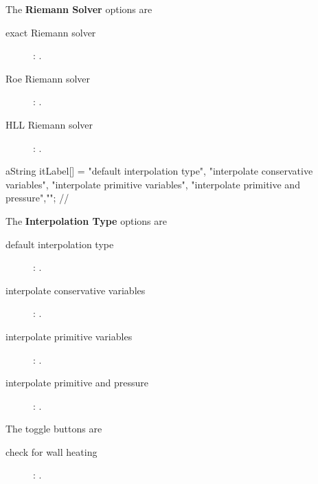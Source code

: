 \documentclass{article}
\begin{document}
\noindent The {\bf Riemann Solver} options are
\begin{description}
  \item[\qquad exact Riemann solver] : .
  \item[\qquad Roe Riemann solver] : .
  \item[\qquad HLL Riemann solver] : .
\end{description}


  aString itLabel[] = {"default interpolation type",
                       "interpolate conservative variables",
                       "interpolate primitive variables",
                       "interpolate primitive and pressure",""}; //

\noindent The {\bf Interpolation Type} options are
\begin{description}
  \item[\qquad default interpolation type] : .
  \item[\qquad interpolate conservative variables] : .
  \item[\qquad interpolate primitive variables] : .
  \item[\qquad interpolate primitive and pressure] : .
\end{description}

\noindent The toggle buttons are
\begin{description}
  \item[\qquad check for wall heating] : .
\end{description}
\end{document}
